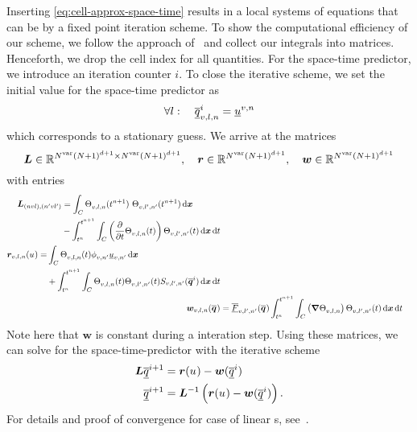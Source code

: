 Inserting \cref{eq:cell-approx-space-time} results in a local systems of equations that can be by a fixed point iteration scheme.
To show the computational efficiency of our scheme, we follow the approach of~\cite{dumbser2008unified} and collect our integrals into matrices.
Henceforth, we drop the cell index for all quantities.
For the space-time predictor, we introduce an iteration counter $i$.
To close the iterative scheme, we set the initial value for the space-time predictor as
\begin{equation}
  \label{eq:initial-guess}
\forall l: \quad \stpredictorCoeff[i][v,l,n] = \ssolCoeff[v,n]
\end{equation}
which corresponds to a stationary guess.
\newcommand{\pleft}{\bm{L}}
\newcommand{\prightsol}{\bm{r}}
\newcommand{\prightpred}{\bm{w}}
We arrive at the matrices
\begin{equation}
  \label{eq:matrices}
  \pleft \in \mathbb{R}^{\NVar \stbasisSize \times \NVar \stbasisSize}, \quad
  \prightsol \in \mathbb{R}^{\NVar \stbasisSize}, \quad
  \prightpred \in \mathbb{R}^{\NVar \stbasisSize}
\end{equation}
with entries
\begin{align}
  \label{eq:predictor-matrices}
\begin{split}
  \pleft_{(n v l), (n' v l')} &=
\intdcell{
  \sttestfunction[][v,l,n](\nextTime) \  \stbasis[][v,l', n'](\nextTime)
}
\\&-
\intdt{\intdcell{
  \left( \pdv{}{t} \sttestfunction[][v,l,n] (t) \right) \stbasis[][v,l',n'] (t)
}}
\end{split}
\\
\begin{split}
\prightsol_{v, l,n} (\ssol) =&
\intdcell{
  \sttestfunction[][v,l,n] (t) \sbasis[][v,n'] \ssolCoeff[][v,n']
}
\\&+
\intdt{\intdcell{
  \sttestfunction[][v,l,n] (t) \stbasis[][v,l',n'](t) S_{v,l',n'}(\stpredictor[i])
}}                             
\end{split}
  \\
\prightpred_{v,l,n} (\stpredictor) &=
\stfluxCoeff[][v,l',n'] (\stpredictor)
\intdt{\intdcell{
  \left( \gradient{\sttestfunction[][v,l,n]} \right) \stbasis[][v,l',n'](t)
}}
\end{align}
Note here that $\prightpred$ is constant during a interation step.
Using these matrices, we can solve for the space-time-predictor with the iterative scheme
\begin{align}
  \label{eq:predictor-iterative}
  \pleft \stpredictorCoeff[i+1] &= \prightsol (\ssol) - \prightpred(\stpredictorCoeff[i]) \\
 \stpredictorCoeff[i+1] &= \pleft^{-1} \left( \prightsol (\ssol) - \prightpred(\stpredictorCoeff[i]) \right).
\end{align}
For details and proof of convergence for case of linear \pde{}s, see~\cite{dumbser2008unified}.

